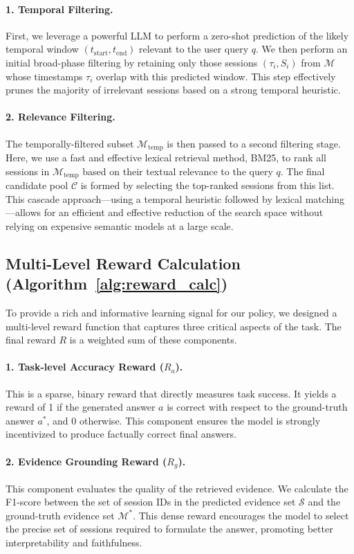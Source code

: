 \documentclass{article} %
\begin{document}
\paragraph{1. Temporal Filtering.}
First, we leverage a powerful LLM to perform a zero-shot prediction of the likely temporal window $(t_{\text{start}}, t_{\text{end}})$ relevant to the user query $q$. We then perform an initial broad-phase filtering by retaining only those sessions $(\tau_i, S_i)$ from $\mathcal{M}$ whose timestamps $\tau_i$ overlap with this predicted window. This step effectively prunes the majority of irrelevant sessions based on a strong temporal heuristic.

\paragraph{2. Relevance Filtering.}
The temporally-filtered subset $\mathcal{M}_{\text{temp}}$ is then passed to a second filtering stage. Here, we use a fast and effective lexical retrieval method, BM25, to rank all sessions in $\mathcal{M}_{\text{temp}}$ based on their textual relevance to the query $q$. The final candidate pool $\mathcal{C}$ is formed by selecting the top-ranked sessions from this list. This cascade approach—using a temporal heuristic followed by lexical matching—allows for an efficient and effective reduction of the search space without relying on expensive semantic models at a large scale.

\subsection{Multi-Level Reward Calculation (Algorithm~\ref{alg:reward_calc})}
To provide a rich and informative learning signal for our policy, we designed a multi-level reward function that captures three critical aspects of the task. The final reward $R$ is a weighted sum of these components.

\paragraph{1. Task-level Accuracy Reward ($R_a$).}
This is a sparse, binary reward that directly measures task success. It yields a reward of 1 if the generated answer $a$ is correct with respect to the ground-truth answer $a^*$, and 0 otherwise. This component ensures the model is strongly incentivized to produce factually correct final answers.

\paragraph{2. Evidence Grounding Reward ($R_g$).}
This component evaluates the quality of the retrieved evidence. We calculate the F1-score between the set of session IDs in the predicted evidence set $\mathcal{S}$ and the ground-truth evidence set $\mathcal{M}^*$. This dense reward encourages the model to select the precise set of sessions required to formulate the answer, promoting better interpretability and faithfulness.
\end{document}
